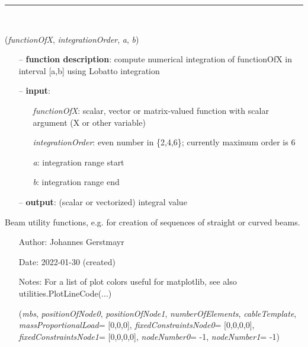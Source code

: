 \begin{itemize}[leftmargin=1.4cm]
\begin{itemize}[leftmargin=1.4cm]
\begin{itemize}[leftmargin=0.5cm]
%
\noindent\rule{8cm}{0.75pt}\vspace{1pt} \\ 
\begin{flushleft}
\label{sec:basicUtilities:LobattoIntegrate}
({\it functionOfX}, {\it integrationOrder}, {\it a}, {\it b})
\end{flushleft}
\setlength{\itemindent}{0.7cm}
\begin{itemize}[leftmargin=0.7cm]
  \item[--]  {\bf function description}: compute numerical integration of functionOfX in interval [a,b] using Lobatto integration  \item[--]  {\bf input}: \vspace{-6pt}
  \begin{itemize}[leftmargin=1.2cm]
\setlength{\itemindent}{-0.7cm}
    \item[] {\it functionOfX}: scalar, vector or matrix-valued function with scalar argument (X or other variable)
    \item[] {\it   integrationOrder}: even number in \{2,4,6\}; currently maximum order is 6
    \item[] {\it   a}: integration range start
    \item[] {\it   b}: integration range end
  \end{itemize}
  \item[--]  {\bf output}: (scalar or vectorized) integral value\vspace{12pt}\end{itemize}
%
\label{sec:module:beams}
 	Beam utility functions, e.g. for creation of sequences of straight or curved beams.
\begin{itemize}[leftmargin=1.4cm]
\setlength{\itemindent}{-1.4cm}
\item[]Author:    Johannes Gerstmayr
\item[]Date:      2022-01-30 (created)
\item[]Notes: 	For a list of plot colors useful for matplotlib, see also utilities.PlotLineCode(...)
\ei
\begin{flushleft}
\label{sec:beams:GenerateStraightLineANCFCable2D}
({\it mbs}, {\it positionOfNode0}, {\it positionOfNode1}, {\it numberOfElements}, {\it cableTemplate}, {\it massProportionalLoad}= [0,0,0], {\it fixedConstraintsNode0}= [0,0,0,0], {\it fixedConstraintsNode1}= [0,0,0,0], {\it nodeNumber0}= -1, {\it nodeNumber1}= -1)

\end{flushleft}
\end{itemize}
\end{itemize}
\end{itemize}
\end{itemize}
